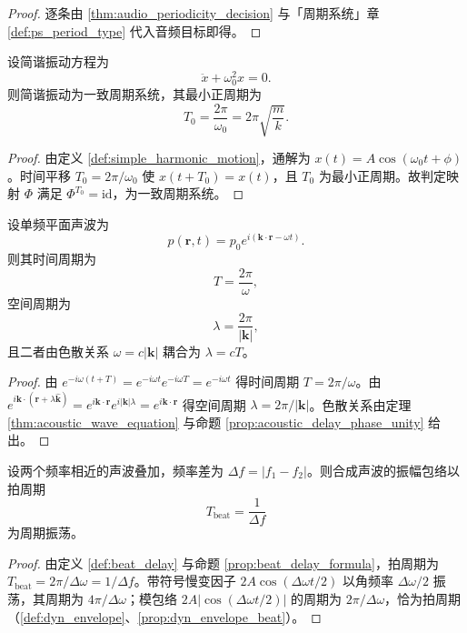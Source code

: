\begin{proof}
逐条由 \cref{thm:audio_periodicity_decision} 与「周期系统」章 \cref{def:ps_period_type} 代入音频目标即得。
\end{proof}

\begin{lemma}[简谐振动的周期判定]\label{lem:shm_periodic}
设简谐振动方程为
\[
\ddot x+\omega_0^2x=0.
\]
则简谐振动为一致周期系统，其最小正周期为
\[
T_0=\frac{2\pi}{\omega_0}=2\pi\sqrt{\frac{m}{k}}.
\]
\end{lemma}

\begin{proof}
由定义 \ref{def:simple_harmonic_motion}，通解为 $x(t)=A\cos(\omega_0t+\phi)$。时间平移 $T_0=2\pi/\omega_0$ 使 $x(t+T_0)=x(t)$，且 $T_0$ 为最小正周期。故判定映射 $\Phi$ 满足 $\Phi^{T_0}=\mathrm{id}$，为一致周期系统。
\end{proof}

\begin{lemma}[单频声波的周期判定]\label{lem:single_tone_periodic}
设单频平面声波为
\[
p(\mathbf r,t)=p_0e^{i(\mathbf k\cdot\mathbf r-\omega t)}.
\]
则其时间周期为
\[
T=\frac{2\pi}{\omega},
\]
空间周期为
\[
\lambda=\frac{2\pi}{|\mathbf k|},
\]
且二者由色散关系 $\omega=c|\mathbf k|$ 耦合为 $\lambda=cT$。
\end{lemma}

\begin{proof}
由 $e^{-i\omega(t+T)}=e^{-i\omega t}e^{-i\omega T}=e^{-i\omega t}$ 得时间周期 $T=2\pi/\omega$。由 $e^{i\mathbf k\cdot(\mathbf r+\lambda\hat{\mathbf k})}=e^{i\mathbf k\cdot\mathbf r}e^{i|\mathbf k|\lambda}=e^{i\mathbf k\cdot\mathbf r}$ 得空间周期 $\lambda=2\pi/|\mathbf k|$。色散关系由定理 \ref{thm:acoustic_wave_equation} 与命题 \ref{prop:acoustic_delay_phase_unity} 给出。
\end{proof}

\begin{lemma}[拍频的周期判定]\label{lem:beat_periodic}
设两个频率相近的声波叠加，频率差为 $\Delta f=|f_1-f_2|$。则合成声波的振幅包络以拍周期
\[
T_{\text{beat}}=\frac{1}{\Delta f}
\]
为周期振荡。
\end{lemma}

\begin{proof}
由定义 \ref{def:beat_delay} 与命题 \ref{prop:beat_delay_formula}，拍周期为 $T_{\text{beat}}=2\pi/\Delta\omega=1/\Delta f$。带符号慢变因子 $2A\cos(\Delta\omega t/2)$ 以角频率 $\Delta\omega/2$ 振荡，其周期为 $4\pi/\Delta\omega$；模包络 $2A|\cos(\Delta\omega t/2)|$ 的周期为 $2\pi/\Delta\omega$，恰为拍周期（\cref{def:dyn_envelope}、\cref{prop:dyn_envelope_beat}）。
\end{proof}

